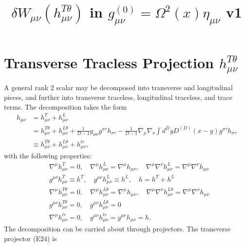 \documentclass[10pt,letterpaper]{article}
\title{$\delta W_{\mu\nu} (h_{\mu\nu}^{T\theta})$ in $g_{\mu\nu}^{(0)} = \Omega^2(x) \eta_{\mu\nu}$ v1}
\date{}
\begin{document}
\allowdisplaybreaks
\maketitle
\noindent 
\section{Transverse Tracless Projection $h^{T\theta}_{\mu\nu}$}
A general rank 2 scalar may be decomposed into transverse and longitudinal pieces, and further into transverse traceless, longitudinal traceless, and trace terms. The decomposition takes the form
\begin{align}
h_{\mu\nu} &= h^T_{\mu\nu} + h^{L}_{\mu\nu}\nonumber\\
&= h^{T\theta}_{\mu\nu} + h^{L\theta}_{\mu\nu} + \frac{1}{D-1} g_{\mu\nu} g^{\sigma\tau}h_{\sigma\tau} - \frac{1}{D-1} \nabla_\mu\nabla_\nu \int d^Dy D^{(D)}(x-y) g^{\sigma\tau}h_{\sigma\tau}\nonumber\\
&\equiv h^{T\theta}_{\mu\nu} + h^{L\theta}_{\mu\nu} + h_{\mu\nu}^{tr},
\end{align}
with the following properties:
\begin{align}
&\nabla^\mu h_{\mu\nu}^T = 0,\quad \nabla^\mu h^L_{\mu\nu} = \nabla^\mu h_{\mu\nu},\quad \nabla^\mu \nabla^\nu h_{\mu\nu}^L = \nabla^\mu \nabla^\nu h_{\mu\nu}\nonumber\\
& g^{\mu\nu}h^{T}_{\mu\nu} \equiv h^T ,\quad g^{\mu\nu}h^{L}_{\mu\nu} \equiv h^L,\quad h = h^T + h^L\nonumber\\
&\nabla^\mu h_{\mu\nu}^{T\theta} = 0,\quad \nabla^\mu h^{L\theta}_{\mu\nu} = \nabla^\mu h_{\mu\nu},\quad
\nabla^\mu \nabla^\nu h_{\mu\nu}^{L\theta} = \nabla^\mu \nabla^\nu h_{\mu\nu}\nonumber\\
& g^{\mu\nu}h^{T\theta}_{\mu\nu} = 0,\quad g^{\mu\nu}h^{L\theta}_{\mu\nu} = 0\nonumber\\
&\nabla^\mu h^{tr}_{\mu\nu} = 0, \quad g^{\mu\nu}h_{\mu\nu}^{tr} = g^{\mu\nu}h_{\mu\nu}= h.
\end{align}
The decomposition can be carried about through projectors. The transverse projector (E24) is
\end{document}
